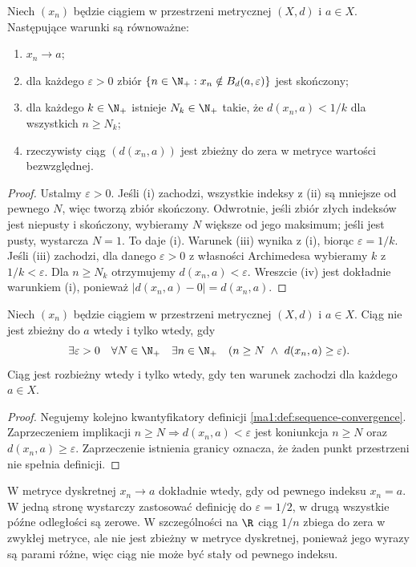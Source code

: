 \begin{stwierdzenie}
\label{ma1:prop:convergence-criteria}
Niech $(x_n)$ będzie ciągiem w przestrzeni metrycznej $(X,d)$ i $a\in X$. Następujące warunki są równoważne:
\begin{enumerate}[label=(\roman*)]
\item $x_n\to a$;
\item dla każdego $\varepsilon>0$ zbiór $\{n\in\N_+:x_n\notin B_d(a,\varepsilon)\}$ jest skończony;
\item dla każdego $k\in\N_+$ istnieje $N_k\in\N_+$ takie, że $d(x_n,a)<1/k$ dla wszystkich $n\ge N_k$;
\item rzeczywisty ciąg $(d(x_n,a))$ jest zbieżny do zera w metryce wartości bezwzględnej.
\end{enumerate}
\end{stwierdzenie}
\begin{proof}
Ustalmy $\varepsilon>0$. Jeśli (i) zachodzi, wszystkie indeksy z (ii) są mniejsze od pewnego $N$, więc tworzą zbiór skończony. Odwrotnie, jeśli zbiór złych indeksów jest niepusty i skończony, wybieramy $N$ większe od jego maksimum; jeśli jest pusty, wystarcza $N=1$. To daje (i).
Warunek (iii) wynika z (i), biorąc $\varepsilon=1/k$. Jeśli (iii) zachodzi, dla danego $\varepsilon>0$ z własności Archimedesa wybieramy $k$ z $1/k<\varepsilon$. Dla $n\ge N_k$ otrzymujemy $d(x_n,a)<\varepsilon$. Wreszcie (iv) jest dokładnie warunkiem (i), ponieważ $|d(x_n,a)-0|=d(x_n,a)$.
\end{proof}

\begin{stwierdzenie}
\label{ma1:prop:nonconvergence}
Niech $(x_n)$ będzie ciągiem w przestrzeni metrycznej $(X,d)$ i $a\in X$. Ciąg nie jest zbieżny do $a$ wtedy i tylko wtedy, gdy
\[
 \exists\varepsilon>0\quad\forall N\in\N_+\quad
 \exists n\in\N_+\quad(n\ge N\ \land\ d(x_n,a)\ge\varepsilon).
\]
Ciąg jest rozbieżny wtedy i tylko wtedy, gdy ten warunek zachodzi dla każdego $a\in X$.
\end{stwierdzenie}
\begin{proof}
Negujemy kolejno kwantyfikatory definicji \ref{ma1:def:sequence-convergence}. Zaprzeczeniem implikacji $n\ge N\Rightarrow d(x_n,a)<\varepsilon$ jest koniunkcja $n\ge N$ oraz $d(x_n,a)\ge\varepsilon$. Zaprzeczenie istnienia granicy oznacza, że żaden punkt przestrzeni nie spełnia definicji.
\end{proof}

\begin{przyklad}
W metryce dyskretnej $x_n\to a$ dokładnie wtedy, gdy od pewnego indeksu $x_n=a$. W jedną stronę wystarczy zastosować definicję do $\varepsilon=1/2$, w drugą wszystkie późne odległości są zerowe. W szczególności na $\R$ ciąg $1/n$ zbiega do zera w zwykłej metryce, ale nie jest zbieżny w metryce dyskretnej, ponieważ jego wyrazy są parami różne, więc ciąg nie może być stały od pewnego indeksu.
\end{przyklad}

